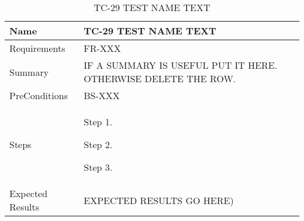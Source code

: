 \begin{table}[htbp!]
\centering
      \begin{tabular}{|p{1.05 in} |p{4.75 in} |}
      \hline
         \rowcolor[rgb]{0.8,0.8,0.8} Name & TC-29 TEST NAME TEXT\\
         \hline
         Requirements & FR-XXX\\  \hline
         Summary & IF A SUMMARY IS USEFUL PUT IT HERE.  OTHERWISE DELETE THE ROW.\\  \hline
         PreConditions & BS-XXX\\     \hline
         Steps &
         \begin{compactenum}
             \item Step 1.
             \item Step 2.
             \item Step 3.
         \end{compactenum}
         \\ \hline
         Expected Results & EXPECTED RESULTS GO HERE)\\
      \hline
      \end{tabular}
      \label{Table:TC-29}
      \caption{TC-29 TEST NAME TEXT}
\end{table} 
